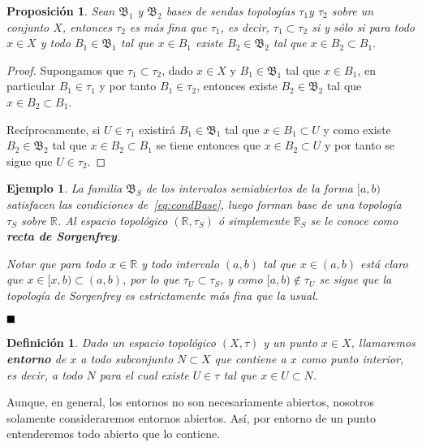 \documentclass[12pt]{article}
\newtheorem{proposition}[theorem]{Proposición}
\newtheorem{definition}[theorem]{Definición}
\newtheorem{example}{Ejemplo}[theorem]
\begin{document}
\begin{proposition}Sean $\mathfrak{B}_1$ y $\mathfrak{B}_2$ bases de sendas topologías $\tau_1 $y $\tau_2$ sobre un conjunto $X$, entonces $\tau_2$ es más fina que $\tau_1$, es decir, $\tau_1 \subset \tau_2$ si y sólo si para todo $x\in X$ y todo $B_1 \in \mathfrak{B}_1$ tal que $x\in B_1$ existe $B_2 \in \mathfrak{B}_2$ tal que $x \in B_2 \subset B_1.$
\end{proposition}
\begin{proof}Supongamos que $\tau_1 \subset \tau_2$, dado $x \in X$ y $B_1\in \mathfrak{B}_1$ tal que $x \in B_1$, en particular $B_1 \in \tau_1$ y por tanto $B_1 \in \tau_2$, entonces existe $B_2 \in \mathfrak{B}_2$ tal que $x \in B_2 \subset B_1$.

Recíprocamente, si $U \in \tau_1$ existirá $B_1 \in \mathfrak{B}_1$ tal que $x \in B_1 \subset U$ y como existe $B_2 \in \mathfrak{B}_2$ tal que $x \in B_2 \subset B_1$ se tiene entonces que $x \in B_2 \subset U$ y por tanto se sigue que $U \in \tau_2$.

\end{proof}

\begin{example}
La familia $\mathfrak{B}_S$ de los intervalos semiabiertos de la forma $[a,b)$ satisfacen las condiciones de~\ref{eq:condBase}, luego forman base de una topología $\tau_S$ sobre $\mathbb{R}$. Al espacio topológico $(\mathbb{R},\tau_S)$ ó simplemente $\mathbb{R}_S$ se le conoce como \textbf{recta de Sorgenfrey}.

Notar que para todo $x \in \mathbb{R}$ y todo intervalo $(a,b)$ tal que $x \in (a,b)$ está claro que $x \in [x,b) \subset (a,b)$, por lo que $\tau_U \subset \tau_S$, y como $[a,b) \notin \tau_U$ se sigue que la topología de Sorgenfrey es estrictamente más fina que la usual.
\end{example}

$\hfill \blacksquare$

\begin{definition}Dado un espacio topológico $(X,\tau)$ y un punto $x \in X$, llamaremos \textbf{entorno} de $x$ a todo subconjunto $N \subset X$ que contiene a $x$ como punto interior, es decir, a todo $N$ para el cual existe $U \in \tau$ tal que $x \in U \subset N$.
\end{definition}

Aunque, en general, los entornos no son necesariamente abiertos, nosotros solamente consideraremos entornos abiertos. Así, por entorno de un punto entenderemos todo abierto que lo contiene.
\end{document}
